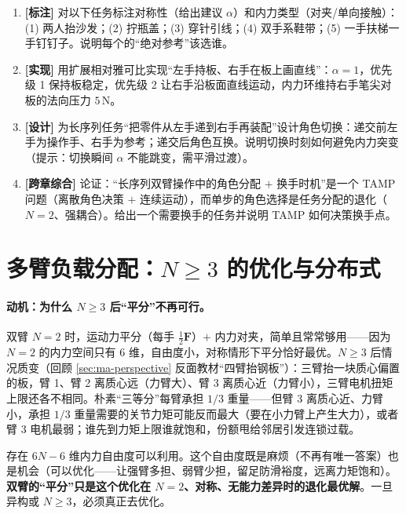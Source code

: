\begin{exercise}
\begin{enumerate}
  \item \textbf{[标注]} 对以下任务标注对称性（给出建议 $\alpha$）和内力类型（对夹/单向接触）：(1) 两人抬沙发；(2) 拧瓶盖；(3) 穿针引线；(4) 双手系鞋带；(5) 一手扶梯一手钉钉子。说明每个的“绝对参考”该选谁。
  \item \textbf{[实现]} 用扩展相对雅可比实现“左手持板、右手在板上画直线”：$\alpha=1$，优先级 1 保持板稳定，优先级 2 让右手沿板面直线运动，内力环维持右手笔尖对板的法向压力 $5$\,N。
  \item \textbf{[设计]} 为长序列任务“把零件从左手递到右手再装配”设计角色切换：递交前左手为操作手、右手为参考；递交后角色互换。说明切换时刻如何避免内力突变（提示：切换瞬间 $\alpha$ 不能跳变，需平滑过渡）。
  \item \textbf{[跨章综合]} 论证：“长序列双臂操作中的角色分配 $+$ 换手时机”是一个 TAMP 问题（离散角色决策 $+$ 连续运动），而单步的角色选择是任务分配的退化（$N=2$、强耦合）。给出一个需要换手的任务并说明 TAMP 如何决策换手点。
\end{enumerate}
\end{exercise}

\section{多臂负载分配：\texorpdfstring{$N\ge 3$}{N 3} 的优化与分布式}
\label{sec:ma-allocation}

\paragraph{动机：为什么 $N\ge 3$ 后“平分”不再可行。}
双臂 $N=2$ 时，运动力平分（每手 $\tfrac12\mathbf{F}$）$+$ 内力对夹，简单且常常够用——因为 $N=2$ 的内力空间只有 $6$ 维，自由度小，对称情形下平分恰好最优。$N\ge3$ 后情况质变（回顾 \cref{sec:ma-perspective} 反面教材“四臂抬钢板”）：三臂抬一块质心偏置的板，臂 1、臂 2 离质心远（力臂大）、臂 3 离质心近（力臂小），三臂电机扭矩上限还各不相同。朴素“三等分”每臂承担 $1/3$ 重量——但臂 3 离质心近、力臂小，承担 $1/3$ 重量需要的关节力矩可能反而最大（要在小力臂上产生大力），或者臂 3 电机最弱；谁先到力矩上限谁就饱和，份额甩给邻居引发连锁过载。

\begin{insight}
存在 $6N-6$ 维内力自由度可以利用。这个自由度既是麻烦（不再有唯一答案）也是机会（可以优化——让强臂多担、弱臂少担，留足防滑裕度，远离力矩饱和）。\textbf{双臂的“平分”只是这个优化在 $N=2$、对称、无能力差异时的退化最优解}。一旦异构或 $N\ge3$，必须真正去优化。
\end{insight}

